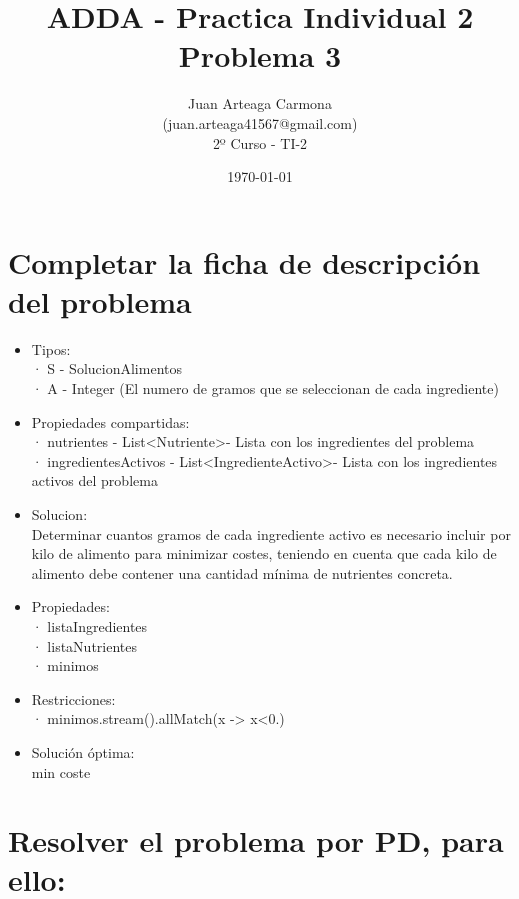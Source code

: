 \documentclass[a4paper,12pt]{article}
\title{ADDA - Practica Individual 2\\ Problema 3}
\author{Juan Arteaga Carmona\\(juan.arteaga41567@gmail.com)\\2º Curso - TI-2}
\date{\today}
\begin{document}
\maketitle

\section{Completar la ficha de descripción del problema}

\begin{itemize}
 \item Tipos:\\
 · S - SolucionAlimentos\\
 · A - Integer \in [0,1000] (El numero de gramos que se seleccionan de cada ingrediente)

 \item Propiedades compartidas:\\
 · nutrientes - List\textless Nutriente\textgreater - Lista con los ingredientes del problema\\
 · ingredientesActivos - List\textless IngredienteActivo\textgreater - Lista con los ingredientes activos del problema

 \item Solucion:\\
Determinar cuantos gramos de cada ingrediente activo es necesario incluir por kilo
de alimento para minimizar costes, teniendo en cuenta que cada kilo de alimento debe
contener una cantidad mínima de nutrientes concreta.

\item Propiedades:\\
  · listaIngredientes\\
  · listaNutrientes\\
  · minimos
  
\item Restricciones:\\
  · minimos.stream().allMatch(x -> x<0.)
\item Solución óptima:\\
      min coste






\end{itemize}
\section{Resolver el problema por PD, para ello:}
\end{document}
